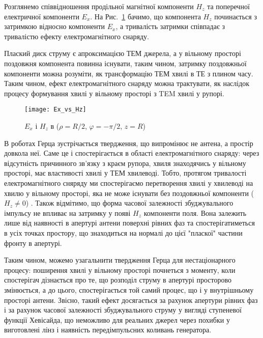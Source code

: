 Розглянемо співвідношення продільної магнітної компоненти $ H_z $ та 
поперечної електричної компоненти $ E_x $. На Рис.~\ref{fig:ex_vs_hz}
бачимо, що компонента $ H_z $ починається з затримкою відносно компоненти 
$ E_x $, а тривалість затримки співпадає з тривалістю ефекту 
електромагнітного снаряду. 

Плаский диск струму є апроксимацією ТЕМ джерела, а у вільному просторі 
поздовжня компонента повинна існувати, таким чином, затримку поздовжньої 
компоненти можна розуміти, як трансформацію ТЕМ хвилі в ТЕ з плином 
часу. Таким чином, ефект електромагнітного снаряду можна трактувати, як 
наслідок процесу формування хвилі у вільному просторі з TEM хвилі у рупорі.

\begin{figure}[h] \begin{center}
\texttt{[image: Ex\_vs\_Hz]}
\caption{$E_x$ і $H_z$ в ($\rho = R/2$, $\varphi = -\pi/2$, $z = R$)} 
\label{fig:ex_vs_hz}
\end{center} \end{figure}

В роботах Герца \cite{imp:Hertz1938} зустрічається твердження, що 
випромінює не антена, а простір довкола неї. Саме це і спостерігається в 
області електромагнітного снаряду: через відсутність причинного зв'язку з 
краєм рупора, хвиля знаходячись у вільному просторі, має властивості хвилі у 
ТЕМ хвилеводі. Тобто, протягом тривалості електромагнітного сняряду ми 
спостерігаємо перетворення хвилі у хвилеводі на хвилю у вільному просторі, 
яка не може існувати без поздовжньої компоненти ($ H_z \neq 0 $) 
\cite{imp:Borisov1991, imp:Harmuth1985}. Також відмітимо, що форма часової 
залежності збуджувального імпульсу не впливає на затримку у появі $ H_z $
компоненти поля. Вона залежить лише від наявності в апертурі антени
поверхні рівних фаз та спостерігатиметься в усіх точках простору, що 
знаходиться на нормалі до цієї "пласкої" частини фронту в апертурі.

Таким чином, можемо узагальнити твердження Герца для нестаціонарного 
процесу: поширення хвилі у вільному просторі почнеться з моменту, 
коли спостерігач дізнається про те, що розподіл струму в апертурі просторово
змінюється, а до цього, спостерігається той самий процес, що і у 
внутрішньому просторі антени. Звісно, такий ефект досягається за рахунок 
апертури рівних фаз і за рахунок часової залежності збуджувального струму у 
вигляді ступеневої функції Хевісайда, що неможливо для реальних джерел через 
похибки у виготовлені лінз і наявність передімпульсних коливань генератора.

